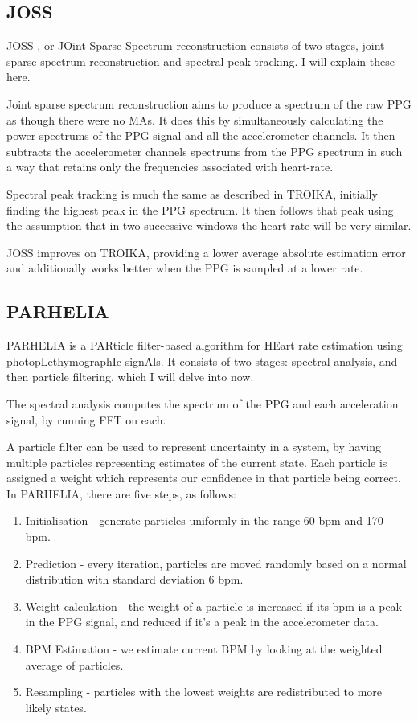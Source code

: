 \documentclass[12pt,a4paper,twoside,openany]{report}
\begin{document}
\subsection{JOSS} \label{joss-intro}

JOSS \cite{Zhang15.2}, or JOint Sparse Spectrum reconstruction consists of two
stages, joint sparse spectrum reconstruction and spectral peak tracking. I
will explain these here.

Joint sparse spectrum reconstruction aims to produce a spectrum of the raw PPG
as though there were no MAs. It does this by simultaneously calculating the
power spectrums of the PPG signal and all the accelerometer channels. It then
subtracts the accelerometer channels spectrums from the PPG spectrum in such a
way that retains only the frequencies associated with heart-rate.

Spectral peak tracking is much the same as described in TROIKA, initially
finding the highest peak in the PPG spectrum. It then follows that peak using
the assumption that in two successive windows the heart-rate will be very
similar.

JOSS improves on TROIKA, providing a lower average absolute estimation error
and additionally works better when the PPG is sampled at a lower rate.


\subsection{PARHELIA}

PARHELIA \cite{Fujita18} is a PARticle filter-based algorithm for HEart rate
estimation using photopLethymographIc signAls. It consists of two stages:
spectral analysis, and then particle filtering, which I will delve into now.

The spectral analysis computes the spectrum of the PPG and each acceleration
signal, by running FFT on each. 

A particle filter can be used to represent uncertainty in a system, by having
multiple particles representing estimates of the current state. Each particle
is assigned a weight which represents our confidence in that particle being
correct. In PARHELIA, there are five steps, as follows:
\begin{enumerate}
	\item Initialisation - generate particles uniformly in the range 60
		bpm and 170 bpm.

	\item Prediction - every iteration, particles are moved randomly based on a normal
		distribution with standard deviation 6 bpm.

	\item Weight calculation - the weight of a particle is increased if
		its bpm is a peak in the PPG signal, and reduced if it's a
		peak in the accelerometer data.

	\item BPM Estimation - we estimate current BPM by looking at the
		weighted average of particles.

	\item Resampling - particles with the lowest weights are redistributed
		to more likely states.
\end{enumerate}
\end{document}
